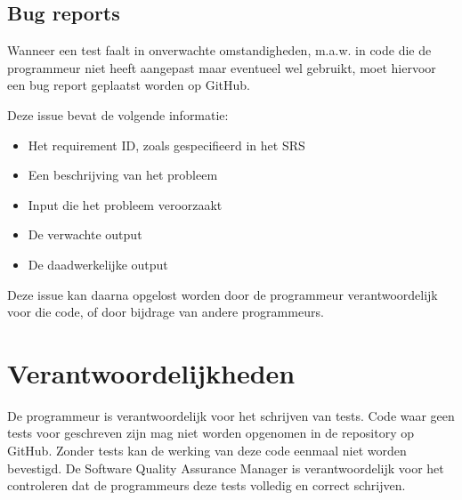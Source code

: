 \subsection{Bug reports}
Wanneer een test faalt in onverwachte omstandigheden, m.a.w. in code die de programmeur niet heeft aangepast maar eventueel wel gebruikt, moet hiervoor een bug report geplaatst worden op GitHub.

\noindent
Deze issue bevat de volgende informatie:
\begin{itemize}
	\item Het requirement ID, zoals gespecifieerd in het SRS\cite{srs}
	\item Een beschrijving van het probleem
	\item Input die het probleem veroorzaakt
	\item De verwachte output
	\item De daadwerkelijke output
\end{itemize}

Deze issue kan daarna opgelost worden door de programmeur verantwoordelijk voor die code, of door bijdrage van andere programmeurs.

\section{Verantwoordelijkheden}
De programmeur is verantwoordelijk voor het schrijven van tests. Code waar geen tests voor geschreven zijn mag niet worden opgenomen in de repository op GitHub. Zonder tests kan de werking van deze code eenmaal niet worden bevestigd. De Software Quality Assurance Manager is verantwoordelijk voor het controleren dat de programmeurs deze tests volledig en correct schrijven.
